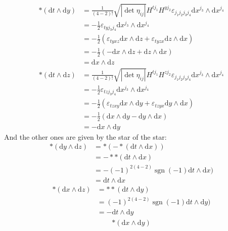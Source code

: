 \documentclass[12pt,a4]{article}
\DeclareMathOperator{\sign}{sgn}
\newcommand{\e}{\mathrm{d}}
\begin{document}
\begin{enumerate}
\begin{enumerate}
        \begin{align*}
          *(\e t \wedge \e y)
                 &= \frac{1}{(4 - 2)!} \sqrt{|\det{\eta_{ij}}|} H^{t j_1} H^{y j_2} \varepsilon_{j_1 j_2 j_3 j_4} \e x^{j_3} \wedge \e x^{j_4}\\
                 &= - \frac{1}{2} \varepsilon_{t y j_3 j_4} \e x^{j_3} \wedge \e x^{j_4}\\
                 &= - \frac{1}{2} \left(\varepsilon_{t y x z} \e x \wedge \e  z + \varepsilon_{t y z x} \e z \wedge \e x\right)\\
                 &= - \frac{1}{2} \left( - \e x \wedge \e  z + \e z \wedge \e x\right)\\
                 &= \e x \wedge \e  z 
        \end{align*}
        \begin{align*}
          *(\e t \wedge \e z)
                 &= \frac{1}{(4 - 2)!} \sqrt{|\det{\eta_{ij}}|} H^{t j_1} H^{z j_2} \varepsilon_{j_1 j_2 j_3 j_4} \e x^{j_3} \wedge \e x^{j_4}\\
                 &= - \frac{1}{2} \varepsilon_{t z j_3 j_4} \e x^{j_3} \wedge \e x^{j_4}\\
                 &= - \frac{1}{2} \left(\varepsilon_{t z x y} \e x \wedge \e  y + \varepsilon_{t z y x} \e y \wedge \e x\right)\\
                 &= - \frac{1}{2} \left( \e x \wedge \e  y - \e y \wedge \e x\right)\\
                 &= - \e x \wedge \e  y 
        \end{align*}
        And the other ones are given by the star of the star:
        \begin{align*}
         *(\e y \wedge \e  z) 
                 &= *(- *(\e t \wedge \e x))\\
                 &= -* *(\e t \wedge \e x)\\
                 &= -(-1)^{2 (4 -2)}\sign (-1)\e t \wedge \e x)\\
                 &= \e t \wedge \e x
        \end{align*}
        \begin{align*}
         *(\e x \wedge \e  z) 
                 &= * *(\e t \wedge \e y)\\
                 &= (-1)^{2 (4 -2)}\sign (-1)\e t \wedge \e y)\\
                 &= - \e t \wedge \e y
        \end{align*}
        \begin{align*}
         *(\e x \wedge \e  y) 

\end{align*}
\end{enumerate}
\end{enumerate}
\end{document}
